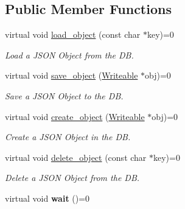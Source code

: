 \subsection*{Public Member Functions}
\begin{DoxyCompactItemize}
\item 
\hypertarget{classDBAdmin_a48ebd30b2e5bb44d23359baa86fe42b9}{virtual void \hyperlink{classDBAdmin_a48ebd30b2e5bb44d23359baa86fe42b9}{load\-\_\-object} (const char $\ast$key)=0}\label{classDBAdmin_a48ebd30b2e5bb44d23359baa86fe42b9}

\begin{DoxyCompactList}\small\item\em Load a J\-S\-O\-N Object from the D\-B. \end{DoxyCompactList}\item 
\hypertarget{classDBAdmin_a29372700a0be4c34ef7ffb956927d9cd}{virtual void \hyperlink{classDBAdmin_a29372700a0be4c34ef7ffb956927d9cd}{save\-\_\-object} (\hyperlink{classWriteable}{Writeable} $\ast$obj)=0}\label{classDBAdmin_a29372700a0be4c34ef7ffb956927d9cd}

\begin{DoxyCompactList}\small\item\em Save a J\-S\-O\-N Object to the D\-B. \end{DoxyCompactList}\item 
\hypertarget{classDBAdmin_aa8915761b88c5ef2df51171ff425c963}{virtual void \hyperlink{classDBAdmin_aa8915761b88c5ef2df51171ff425c963}{create\-\_\-object} (\hyperlink{classWriteable}{Writeable} $\ast$obj)=0}\label{classDBAdmin_aa8915761b88c5ef2df51171ff425c963}

\begin{DoxyCompactList}\small\item\em Create a J\-S\-O\-N Object in the D\-B. \end{DoxyCompactList}\item 
\hypertarget{classDBAdmin_a6fffd56ad4f9db9cd951a91ecb41373b}{virtual void \hyperlink{classDBAdmin_a6fffd56ad4f9db9cd951a91ecb41373b}{delete\-\_\-object} (const char $\ast$key)=0}\label{classDBAdmin_a6fffd56ad4f9db9cd951a91ecb41373b}

\begin{DoxyCompactList}\small\item\em Delete a J\-S\-O\-N Object from the D\-B. \end{DoxyCompactList}\item 
\hypertarget{classDBAdmin_a9a3ac4ee0b0c6453120fca46e126efe2}{virtual void {\bfseries wait} ()=0}\label{classDBAdmin_a9a3ac4ee0b0c6453120fca46e126efe2}

\end{DoxyCompactItemize}


